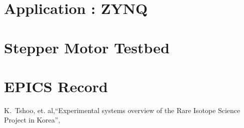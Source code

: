 \documentclass[11pt
-  , a4paper
  , article
  , oneside
]{memoir}
\begin{document}
\begin{multicols}{2}
\chapter{Application : ZYNQ  }

\chapter{Stepper Motor Testbed}

\chapter{EPICS Record}

\end{multicols}
	
	
\hfil\break


\clearpage
\vspace*{0.5cm}
\renewcommand{\bibname}{References}
\begin{thebibliography}{9}   %
 K.~Tshoo,{ et. al},``Experimental systems overview of the Rare Isotope Science Project in Korea'',

\end{thebibliography}
\end{document}
